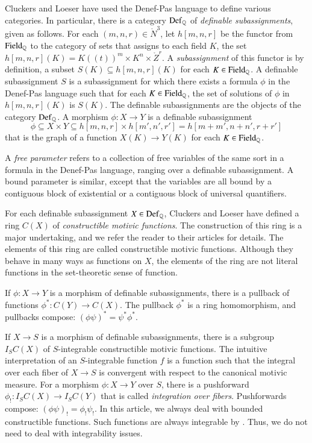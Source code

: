 Cluckers and Loeser have used the Denef-Pas language to define various categories.  In particular, there
is a category  ${\operatorname{Def}}_{\mathbb{Q}}$ of {\it definable subassignments}, given as follows.
For each $(m,n,r)\in\ring{N}^3$, let $h[m,n,r]$ be the functor from ${\operatorname{Field}}_{\mathbb{Q}}$ to the category of sets that assigns
to each field $K$, the set $h[m,n,r](K)=K((t))^m\times K^n\times \ring{Z}^r$.  A {\it subassignment} of this functor is by
definition, a subset $S(K) \subseteq h[m,n,r](K)$ for each $K\in{\operatorname{Field}}_{\mathbb{Q}}$.  
A definable subassignment $S$ is  a subassignment for which there exists a formula $\phi$ in the Denef-Pas language such that for each $K\in{\operatorname{Field}}_{\mathbb{Q}}$, 
the set of solutions of $\phi$ in $h[m,n,r](K)$ is $S(K)$.
The definable subassignments are the objects of the category ${\operatorname{Def}}_{\mathbb{Q}}$.  
A morphism $\phi:X\to Y$ is a definable subassignment 
\[
\phi\subseteq X\times Y\subseteq h[m,n,r]\times h[m',n',r'] = h[m+m',n+n',r+r']
\]
that is the graph of a function $X(K)\to Y(K)$ for each $K\in {\operatorname{Field}}_{\mathbb{Q}}$.

A {\it free parameter} refers to a collection of free variables of the same sort in a formula in the Denef-Pas language, ranging over a definable
subassignment.  A bound parameter is similar, except that the variables are all bound by a contiguous block of existential or
a contiguous block of universal quantifiers.

For each definable subassignment $X\in {\operatorname{Def}}_{\mathbb{Q}}$, Cluckers and Loeser have defined a ring $C(X)$ of 
{\it constructible motivic functions}.  The construction of this ring is a major undertaking, and we refer the reader
to their articles for details.     The elements of this ring are called constructible motivic functions.  Although
they behave in many ways as functions on $X$,  the elements of the ring are not literal functions in the set-theoretic
sense of function.

If $\phi:X\to Y$ is a morphism of definable subassignments, there is a pullback of functions $\phi^*:C(Y)\to C(X)$.  The
pullback $\phi^*$ is a ring homomorphism, and  pullbacks compose: $(\phi\psi)^* = \psi^* \phi^*$.

If $X\to S$ is a morphism of definable subassignments, there is  a subgroup $I_S C(X)$ of $S$-integrable constructible motivic functions.
The intuitive interpretation of an $S$-integrable function $f$ is a function such that the integral over each fiber of $X\to S$ 
is convergent with respect to the canonical motivic measure.  For a morphism $\phi: X\to Y$ over $S$, there is a 
pushforward $\phi_!:I_SC(X)\to I_SC(Y)$ that is called {\it integration over fibers}.  Pushforwards compose: $(\phi\psi)_! = \phi_!\psi_!$.
In this article, we always deal with bounded constructible functions.  Such functions are always integrable by 
\cite[Prop~12.2.2]{cluckers2008constructible}.
Thus, we do not need to deal with integrability issues.

